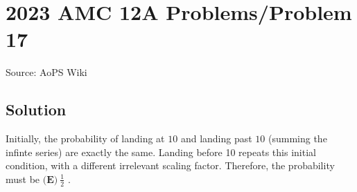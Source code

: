 \documentclass[12pt]{article}
\begin{document}
\section*{{2023 AMC 12A Problems/Problem 17}}
Source: AoPS Wiki

\subsection*{Solution}
Initially, the probability of landing at $10$ and landing past $10$ (summing the infinte series) are exactly the same. Landing before 10 repeats this initial condition, with a different irrelevant scaling factor. Therefore, the probability must be $\boxed{\textbf{(E)}~\frac12}$ .
\end{document}

